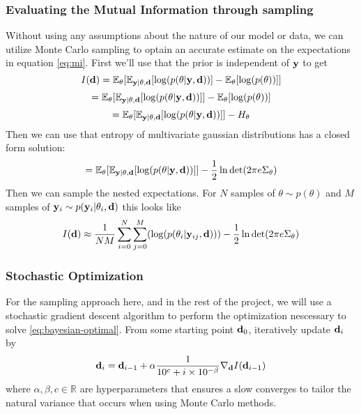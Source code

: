 \subsubsection{Evaluating the Mutual Information through sampling}
Without using any assumptions about the nature of our model or data, we can utilize Monte Carlo sampling to optain an accurate estimate on the expectations in equation \ref{eq:mi}.
First we'll use that the prior is independent of $\mathbf{y}$ to get
\begin{equation}
  I(\mathbf{d})  = \mathbb{E}_{\mathbf{\theta}}[\mathbb{E}_{\mathbf{y}| \theta, \mathbf{d}} [\log(p(\theta | \mathbf{y}, \mathbf{d}))] - \mathbb{E}_{\theta}[\log(p(\theta))]]
\end{equation}
\begin{equation}
  = \mathbb{E}_{\mathbf{\theta}}[\mathbb{E}_{\mathbf{y}| \theta, \mathbf{d}} [\log(p(\theta | \mathbf{y}, \mathbf{d}))]] - \mathbb{E}_{\theta}[\log(p(\theta))]
\end{equation}
\begin{equation}
  = \mathbb{E}_{\mathbf{\theta}}[\mathbb{E}_{\mathbf{y}| \theta, \mathbf{d}} [\log(p(\theta | \mathbf{y}, \mathbf{d}))]] - H_\theta
\end{equation}
Then we can use that entropy of multivariate gaussian distributions has a closed form solution:
\begin{equation}
  = \mathbb{E}_{\mathbf{\theta}}[\mathbb{E}_{\mathbf{y}| \theta, \mathbf{d}} [\log(p(\theta | \mathbf{y}, \mathbf{d}))]] - \frac{1}{2}\ln \det (2\pi e\Sigma_\theta)
\end{equation}
Then we can sample the nested expectations. For $N$ samples of $\theta \sim p(\theta)$ and $M$ samples of $\mathbf{y}_i \sim p(\mathbf{y}_i | \theta_i, \mathbf{d})$ this looks like
\begin{equation}
  I(\mathbf{d}) \approx \frac{1}{NM}\sum_{i=0}^N\sum_{j=0}^M(\log (p(\theta_i | \mathbf{y}_{ij}, \mathbf{d}))) - \frac{1}{2}\ln \det (2\pi e\Sigma_\theta)
\end{equation}

\subsubsection{Stochastic Optimization}
For the sampling approach here, and in the rest of the project, we will use a stochastic gradient descent algorithm to perform the optimization nescessary to solve \ref{eq:bayesian-optimal}.
From some starting point $\mathbf{d}_0$, iteratively update $\mathbf{d}_i$ by
\begin{equation}
  \mathbf{d}_i = \mathbf{d}_{i-1} + \alpha \frac{1}{10^c + i \times 10^{-\beta}} \nabla_{\mathbf{d}} I(\mathbf{d}_{i-1})
\end{equation}
where $\alpha, \beta, c \in \mathbb{R}$ are hyperparameters that ensures a slow converges to tailor the natural variance that occurs when using Monte Carlo methods.

